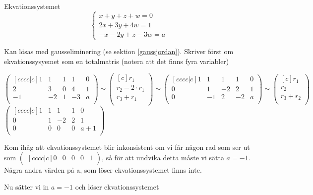 \documentclass[../../main.tex]{subfiles}
\begin{document}
\begin{solution}{15}

Ekvationssystemet 
$$
\begin{cases}
x + y + z + w = 0\\
2x + 3y + 4w = 1\\
-x -2y + z - 3w = a
\end{cases}
$$

Kan lösas med gausseliminering (se sektion \ref{gaussjordan}). Skriver först om ekvationssysyemet som en totalmatris (notera att det finns fyra variabler)

$$
\begin{pmatrix}[cccc|c]
1 & 1 & 1 & 1 & 0\\
2 & 3 & 0 & 4 & 1\\
-1 & -2 & 1 & -3 & a\\
\end{pmatrix}
\sim 
\begin{pmatrix}[c]
r_1\\
r_2 - 2\cdot r_1\\
r_3 + r_1\\
\end{pmatrix}
\sim
\begin{pmatrix}[cccc|c]
1 & 1 & 1 & 1 & 0\\
0 & 1 & -2 & 2 & 1\\
0 & -1 & 2 & -2 & a\\
\end{pmatrix}
\sim
\begin{pmatrix}[c]
r_1\\
r_2\\
r_3 + r_2\\
\end{pmatrix}
$$
$
\begin{pmatrix}[cccc|c]
1 & 1 & 1 & 1 & 0\\
0 & 1 & -2 & 2 & 1\\
0 & 0 & 0 & 0 & a+1\\
\end{pmatrix}
$

Kom ihåg att ekvationssystemet blir inkonsistent om vi får någon rad som ser ut som $\begin{pmatrix}[cccc|c]
0 & 0 & 0 & 0 & 1
\end{pmatrix}$, så för att undvika detta måste vi sätta $a = -1$. Några andra värden på a, som löser ekvationssystemet finns inte.

Nu sätter vi in $a=-1$ och löser ekvationssystemet


\end{solution}
\end{document}

